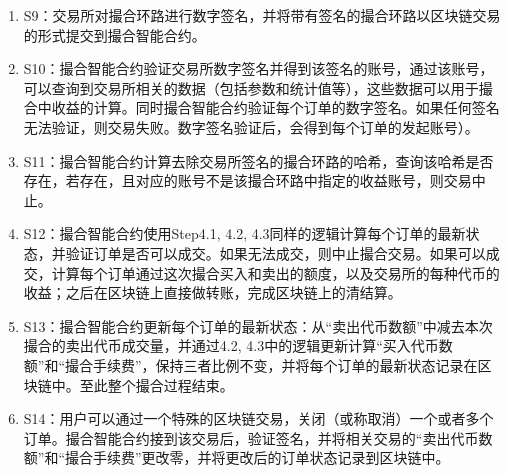 \documentclass[UTF8,nofonts]{ctexart}
\begin{document}
\begin{appendices}
\begin{enumerate}
	\item S9：交易所对撮合环路进行数字签名，并将带有签名的撮合环路以区块链交易的形式提交到撮合智能合约。
	\item S10：撮合智能合约验证交易所数字签名并得到该签名的账号，通过该账号，可以查询到交易所相关的数据（包括参数和统计值等），这些数据可以用于撮合中收益的计算。同时撮合智能合约验证每个订单的数字签名。如果任何签名无法验证，则交易失败。数字签名验证后，会得到每个订单的发起账号）。
	\item S11：撮合智能合约计算去除交易所签名的撮合环路的哈希，查询该哈希是否存在，若存在，且对应的账号不是该撮合环路中指定的收益账号，则交易中止。
	\item S12：撮合智能合约使用Step4.1, 4.2, 4.3同样的逻辑计算每个订单的最新状态，并验证订单是否可以成交。如果无法成交，则中止撮合交易。如果可以成交，计算每个订单通过这次撮合买入和卖出的额度，以及交易所的每种代币的收益；之后在区块链上直接做转账，完成区块链上的清结算。
	\item S13：撮合智能合约更新每个订单的最新状态：从“卖出代币数额”中减去本次撮合的卖出代币成交量，并通过4.2, 4.3中的逻辑更新计算“买入代币数额”和“撮合手续费”，保持三者比例不变，并将每个订单的最新状态记录在区块链中。至此整个撮合过程结束。

	\item S14：用户可以通过一个特殊的区块链交易，关闭（或称取消）一个或者多个订单。撮合智能合约接到该交易后，验证签名，并将相关交易的“卖出代币数额”和“撮合手续费”更改零，并将更改后的订单状态记录到区块链中。
\end{enumerate}


\end{appendices}
\end{document}
